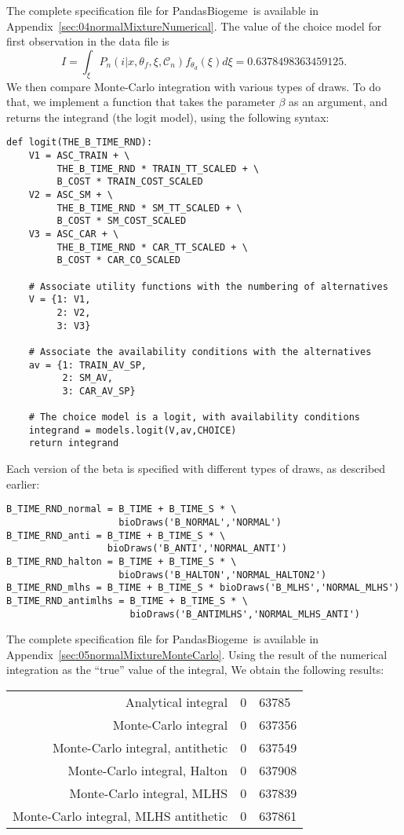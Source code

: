 \documentclass[12pt,a4paper]{article}
\newcommand{\C}{\mathcal{C}}
\newcommand{\PBIOGEME}{PandasBiogeme}
\begin{document}
The complete specification file for \PBIOGEME\ is available in
Appendix~\ref{sec:04normalMixtureNumerical}. The value of the
choice model for first observation in the data file is 
\begin{equation}
I =  \int_\xi P_n(i|x,\theta_f,\xi,\C_n) f_{\theta_d}(\xi)d\xi = 0.6378498363459125.
\end{equation}
We then compare Monte-Carlo integration with various types of
draws. To do that, we implement a function that takes the parameter
$\beta$ as an argument, and returns the integrand (the logit model), using the
following syntax:
\begin{lstlisting}
def logit(THE_B_TIME_RND):
    V1 = ASC_TRAIN + \
         THE_B_TIME_RND * TRAIN_TT_SCALED + \
         B_COST * TRAIN_COST_SCALED
    V2 = ASC_SM + \
         THE_B_TIME_RND * SM_TT_SCALED + \
         B_COST * SM_COST_SCALED
    V3 = ASC_CAR + \
         THE_B_TIME_RND * CAR_TT_SCALED + \
         B_COST * CAR_CO_SCALED

    # Associate utility functions with the numbering of alternatives
    V = {1: V1,
         2: V2,
         3: V3}

    # Associate the availability conditions with the alternatives
    av = {1: TRAIN_AV_SP,
          2: SM_AV,
          3: CAR_AV_SP}

    # The choice model is a logit, with availability conditions
    integrand = models.logit(V,av,CHOICE)
    return integrand
\end{lstlisting}
Each version of the beta is specified with different types of draws,
as described earlier:
\begin{lstlisting}
B_TIME_RND_normal = B_TIME + B_TIME_S * \
                    bioDraws('B_NORMAL','NORMAL')
B_TIME_RND_anti = B_TIME + B_TIME_S * \
                  bioDraws('B_ANTI','NORMAL_ANTI')
B_TIME_RND_halton = B_TIME + B_TIME_S * \
                    bioDraws('B_HALTON','NORMAL_HALTON2')
B_TIME_RND_mlhs = B_TIME + B_TIME_S * bioDraws('B_MLHS','NORMAL_MLHS')
B_TIME_RND_antimlhs = B_TIME + B_TIME_S * \
                      bioDraws('B_ANTIMLHS','NORMAL_MLHS_ANTI')
\end{lstlisting}

The complete specification file for \PBIOGEME\ is available in
Appendix~\ref{sec:05normalMixtureMonteCarlo}. Using the result of the numerical integration as the ``true'' value of
the integral, We obtain the following results:
\begin{center}
\begin{tabular}{rr@{.}l}
Analytical integral & 0&63785 \\
Monte-Carlo integral & 0&637356 \\
Monte-Carlo integral, antithetic & 0&637549 \\
Monte-Carlo integral, Halton & 0&637908 \\
Monte-Carlo integral, MLHS & 0&637839 \\
Monte-Carlo integral, MLHS antithetic & 0&637861 \\
\end{tabular}
\end{center}
\end{document}
